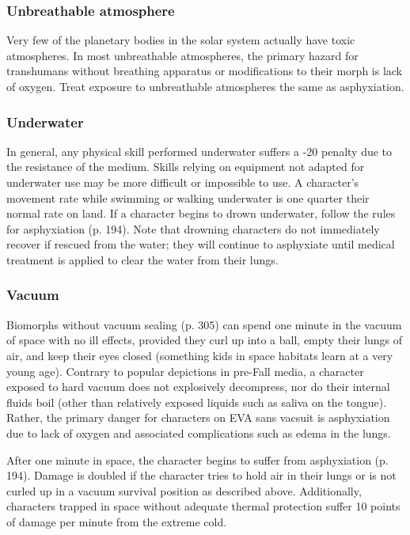 \subsubsection{Unbreathable atmosphere} 

Very few of the planetary bodies in the solar system actually have toxic atmospheres. In most unbreathable atmospheres, the primary hazard for transhumans without breathing apparatus or modifications to their morph is lack of oxygen. Treat exposure to unbreathable atmospheres the same as asphyxiation. 

\subsubsection{Underwater} 

In general, any physical skill performed underwater suffers a -20 penalty due to the resistance of the medium. Skills relying on equipment not adapted for underwater use may be more difficult or impossible to use. A character’s movement rate while swimming or walking underwater is one quarter their normal rate on land. If a character begins to drown underwater, follow the rules for asphyxiation (p. 194). Note that drowning characters do not immediately recover if rescued from the water; they will continue to asphyxiate until medical treatment is applied to clear the water from their lungs. 

\subsubsection{Vacuum} 

Biomorphs without vacuum sealing (p. 305) can spend one minute in the vacuum of space with no ill effects, provided they curl up into a ball, empty their lungs of air, and keep their eyes closed (something kids in space habitats learn at a very young age). Contrary to popular depictions in pre-Fall media, a character exposed to hard vacuum does not explosively decompress, nor do their internal fluids boil (other than relatively exposed liquids such as saliva on the tongue). Rather, the primary danger for characters on EVA sans vacsuit is asphyxiation due to lack of oxygen and associated complications such as edema in the lungs. 

After one minute in space, the character begins to suffer from asphyxiation (p. 194). Damage is doubled if the character tries to hold air in their lungs or is not curled up in a vacuum survival position as described above. Additionally, characters trapped in space without adequate thermal protection suffer 10 points of damage per minute from the extreme cold. 

